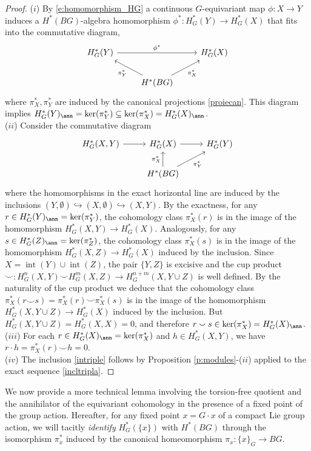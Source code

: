 \documentclass[11pt,a4paper,reqno]{article}
\DeclareMathOperator{\interior}{int}
\numberwithin{equation}{section}
\theoremstyle{definition}
\begin{document}
\begin{proof}


($i$) By \eqref{e:homomorphism_HG}
a continuous $G$-equivariant map $\phi:X\to Y$ induces a $H^*(BG)$-algebra homomorphism $\phi^*:H^*_G(Y)\to H^*_G(X)$ that fits into the commutative diagram, 
\[ 
\begin{tikzcd}
 H^*_G(Y)
 \arrow[rr,"\phi^*"]
 & & 
 H^*_G(X)
 \\ 
 &
 H^*(BG)
 \arrow[ul,"\pi_Y^*"]
 \arrow[ur,"\pi_X^*"']
 & 
\end{tikzcd}
\]
where $ \pi_X^*, \pi_Y^* $ 
are induced by the canonical projections \eqref{proiecan}.
This diagram implies $H^*_G(Y)_\ann=\ker(\pi_Y^*)\subseteq\ker(\pi_X^*)= H^*_G(X)_\ann$.
\\[1mm]
($ii$) 
Consider the commutative diagram
\[ 
\begin{tikzcd}
 H^*_G(X,Y)
 \arrow[r]
 & 
 H^*_G(X)
 \arrow[r]
 & 
 H^*_G(Y)
 \\
 & 
 H^*(BG)
 \arrow[u,"\pi_X^*"]
 \arrow[ur,"\pi_Y^*"']
 & 
\end{tikzcd}
\]
where the homomorphisms in the exact horizontal line are induced by the inclusions
$ (Y,\emptyset) \hookrightarrow 
(X,\emptyset) \hookrightarrow (X,Y) $.
By the exactness, for any $r\in H_G^*(Y)_\ann=\ker(\pi_Y^*)$, the cohomology class $\pi_X^*(r)$ is in the image of the homomorphism $H^*_G(X,Y)\to H^*_G(X)$. Analogously, for any $s\in H_G^*(Z)_\ann=\ker(\pi_Z^*)$, the cohomology class $\pi_X^*(s)$ is in the image of the homomorphism $H^*_G(X,Z)\to H^*_G(X)$ induced by the inclusion.
Since $X=\interior(Y)\cup\interior(Z)$, the pair $\{Y,Z\}$ is excisive and
the cup product $\smallsmile: H^{n}_G(X,Y)\smallsmile H^{m}_G(X,Z)\to H^{n+m}_G(X,Y\cup Z)$ is well defined.
By the naturality of the cup product we deduce that the cohomology class $\pi_X^*(r\smallsmile s)=\pi_X^*(r)\smallsmile \pi_X^*(s)$ is in the image of the homomorphism $H^*_G(X,Y\cup Z)\to H^*_G(X)$ induced by the inclusion. But $H^*_G(X,Y\cup Z)=H^*_G(X,X)=0$, and therefore $r\smallsmile s\in\ker(\pi_X^*)=H_G^*(X)_\ann$.
\\[1mm]
($iii$) For each $r\in H^*_G(X)_\ann=\ker(\pi_X^*)$ and $h\in H^*_G(X,Y)$, we have $r\cdot h=\pi_X^*(r)\smallsmile h=0$.
\\[1mm]
($iv$) The inclusion 
\eqref{intriple} follows by  Proposition \ref{p:modules}-($ii$) applied to the exact sequence \eqref{incltripla}.
\end{proof}



We now provide a more technical lemma involving the torsion-free quotient and the annihilator of the equivariant cohomology in the presence of a fixed point of the group action. Hereafter, for any fixed point $x=G\cdot x$ of a compact Lie group action, we will tacitly {\it identify} $H^*_G(\{x\})  $ with $H^*(BG) $ through the isomorphism  $ \pi_x^* $ induced by the canonical homeomorphism $\pi_x:\{x\}_G\to BG$.
\end{document}
